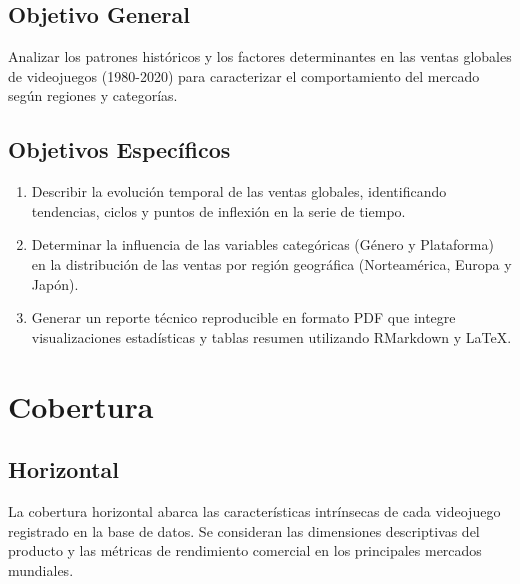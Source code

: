 \documentclass[oneside,11pt]{Latex/Classes/PhDthesisPSnPDF}
\begin{document}
\subsection{Objetivo General}

Analizar los patrones históricos y los factores determinantes en las
ventas globales de videojuegos (1980-2020) para caracterizar el
comportamiento del mercado según regiones y categorías.

\subsection{Objetivos Específicos}

\begin{enumerate}
  \item Describir la evolución temporal de las ventas globales, identificando tendencias, ciclos y puntos de inflexión en la serie de tiempo.
  \item Determinar la influencia de las variables categóricas (Género y Plataforma) en la distribución de las ventas por región geográfica (Norteamérica, Europa y Japón).
  \item Generar un reporte técnico reproducible en formato PDF que integre visualizaciones estadísticas y tablas resumen utilizando RMarkdown y LaTeX.
\end{enumerate}

\section{Cobertura}

\subsection{Horizontal}

La cobertura horizontal abarca las características intrínsecas de cada
videojuego registrado en la base de datos. Se consideran las dimensiones
descriptivas del producto y las métricas de rendimiento comercial en los
principales mercados mundiales.
\end{document}
